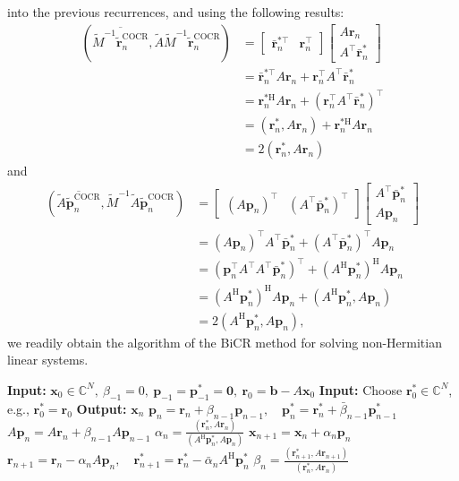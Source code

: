 {into the previous recurrences, and using the following results:}
\[\begin{aligned}
(\overline{\widetilde M^{-1}\widetilde{\bm r}_n^{\mathrm{COCR}}},\widetilde A\widetilde M^{-1}\widetilde{\bm r}_n^{\mathrm{COCR}})&=\begin{bmatrix}\bar{\bm r}_n^{*\top}&\bm r_n^{\top}\end{bmatrix}\begin{bmatrix}A\bm r_n\\A^{\top}\bar{\bm r}_n^{*}\end{bmatrix}\\
&=\bar{\bm r}_n^{*\top}A\bm r_n+\bm r_n^{\top}A^{\top}\bar{\bm r}_n^{*}\\
&=\bm r_n^{*\mathrm H}A\bm r_n+(\bm r_n^{\top}A^{\top}\bar{\bm r}_n^{*})^{\top}\\
&=(\bm r_n^{*},A\bm r_n)+\bm r_n^{*\mathrm H}A\bm r_n\\
&=2(\bm r_n^{*},A\bm r_n)
\end{aligned}\]
{and}
\[\begin{aligned}
(\overline{\widetilde A\widetilde{\bm p}_n^{\mathrm{COCR}}},\widetilde M^{-1}\widetilde A\widetilde{\bm p}_n^{\mathrm{COCR}})&=\begin{bmatrix}(A\bm p_n)^{\top}&(A^{\top}\bar{\bm p}_n^{*})^{\top}\end{bmatrix}\begin{bmatrix}A^{\top}\bar{\bm p}_n^{*}\\A\bm p_n\end{bmatrix}\\
&=(A\bm p_n)^{\top}A^{\top}\bar{\bm p}_n^{*}+(A^{\top}\bar{\bm p}_n^{*})^{\top}A\bm p_n\\
&=(\bm p_n^{\top}A^{\top}A^{\top}\bar{\bm p}_n^{*})^{\top}+(A^{\mathrm H}\bm p_n^{*})^{\mathrm H}A\bm p_n\\
&=(A^{\mathrm H}\bm p_n^{*})^{\mathrm H}A\bm p_n+(A^{\mathrm H}\bm p_n^{*},A\bm p_n)\\
&=2(A^{\mathrm H}\bm p_n^{*},A\bm p_n),
\end{aligned}\]
{we readily obtain the algorithm of the BiCR method for solving non-Hermitian linear systems.}
\begin{algorithm}[H]\caption{{The BiCR method}}\label{alg:bicr}\begin{algorithmic}[1]
\Statex\textbf{Input:} $\bm x_0\in\mathbb C^N,\ \beta_{-1}=0,\ \bm p_{-1}=\bm p_{-1}^{*}=\bm0,\ \bm r_0=\bm b-A\bm x_0$
\Statex\textbf{Input:} {Choose $\bm r_0^{*}\in\mathbb C^N$, e.g., $\bm r_0^{*}=\bm r_0$}
\Statex\textbf{Output:} $\bm x_n$
\State $\bm p_n=\bm r_n+\beta_{n-1}\bm p_{n-1},\quad\bm p_n^{*}=\bm r_n^{*}+\bar\beta_{n-1}\bm p_{n-1}^{*}$
\State $A\bm p_n=A\bm r_n+\beta_{n-1}A\bm p_{n-1}$
\State $\alpha_n=\frac{(\bm r_n^{*},A\bm r_n)}{(A^{\mathrm H}\bm p_n^{*},A\bm p_n)}$
\State $\bm x_{n+1}=\bm x_n+\alpha_n\bm p_n$
\State $\bm r_{n+1}=\bm r_n-\alpha_nA\bm p_n,\quad\bm r_{n+1}^{*}=\bm r_n^{*}-\bar\alpha_nA^{\mathrm H}\bm p_n^{*}$
\State $\beta_n=\frac{(\bm r_{n+1}^{*},A\bm r_{n+1})}{(\bm r_n^{*},A\bm r_n)}$
\EndFor\end{algorithmic}\end{algorithm}
